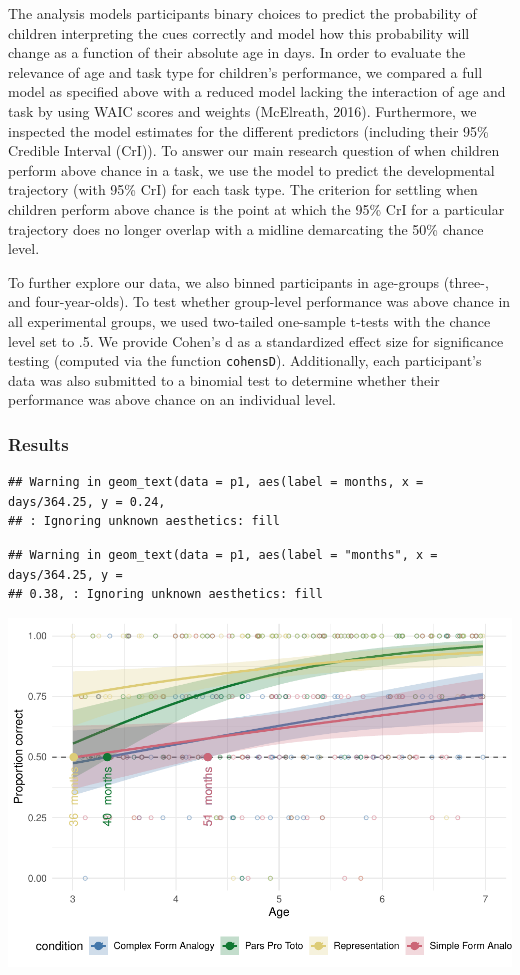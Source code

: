 \documentclass[
  man]{apa6}
\begin{document}
The analysis models participants binary choices to predict the probability of children interpreting the cues correctly and model how this probability will change as a function of their absolute age in days. In order to evaluate the relevance of age and task type for children's performance, we compared a full model as specified above with a reduced model lacking the interaction of age and task by using WAIC scores and weights (McElreath, 2016). Furthermore, we inspected the model estimates for the different predictors (including their 95\% Credible Interval (CrI)). To answer our main research question of when children perform above chance in a task, we use the model to predict the developmental trajectory (with 95\% CrI) for each task type. The criterion for settling when children perform above chance is the point at which the 95\% CrI for a particular trajectory does no longer overlap with a midline demarcating the 50\% chance level.

To further explore our data, we also binned participants in age-groups (three-, and four-year-olds). To test whether group-level performance was above chance in all experimental groups, we used two-tailed one-sample t-tests with the chance level set to .5. We provide Cohen's d as a standardized effect size for significance testing (computed via the function \texttt{cohensD}). Additionally, each participant's data was also submitted to a binomial test to determine whether their performance was above chance on an individual level.

\subsubsection{Results}\label{results}

\begin{verbatim}
## Warning in geom_text(data = p1, aes(label = months, x = days/364.25, y = 0.24,
## : Ignoring unknown aesthetics: fill
\end{verbatim}

\begin{verbatim}
## Warning in geom_text(data = p1, aes(label = "months", x = days/364.25, y =
## 0.38, : Ignoring unknown aesthetics: fill
\end{verbatim}

\includegraphics{symlit_rep_manuscript_files/figure-latex/S1_bayes_plot_no_facets-1.pdf}
\end{document}
